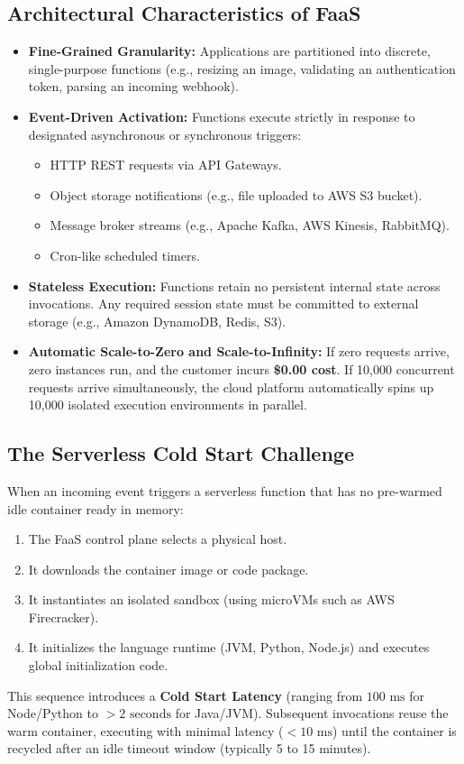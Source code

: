 \documentclass[11pt,a4paper,openany]{report}
\begin{document}
\subsection{Architectural Characteristics of FaaS}
\begin{itemize}[leftmargin=*]
  \item \textbf{Fine-Grained Granularity:} Applications are partitioned into discrete, single-purpose functions (e.g., resizing an image, validating an authentication token, parsing an incoming webhook).
  \item \textbf{Event-Driven Activation:} Functions execute strictly in response to designated asynchronous or synchronous triggers:
    \begin{itemize}
      \item HTTP REST requests via API Gateways.
      \item Object storage notifications (e.g., file uploaded to AWS S3 bucket).
      \item Message broker streams (e.g., Apache Kafka, AWS Kinesis, RabbitMQ).
      \item Cron-like scheduled timers.
    \end{itemize}
  \item \textbf{Stateless Execution:} Functions retain no persistent internal state across invocations. Any required session state must be committed to external storage (e.g., Amazon DynamoDB, Redis, S3).
  \item \textbf{Automatic Scale-to-Zero and Scale-to-Infinity:} If zero requests arrive, zero instances run, and the customer incurs \textbf{\$0.00 cost}. If 10,000 concurrent requests arrive simultaneously, the cloud platform automatically spins up 10,000 isolated execution environments in parallel.
\end{itemize}

\subsection{The Serverless Cold Start Challenge}
When an incoming event triggers a serverless function that has no pre-warmed idle container ready in memory:
\begin{enumerate}[leftmargin=*]
  \item The FaaS control plane selects a physical host.
  \item It downloads the container image or code package.
  \item It instantiates an isolated sandbox (using microVMs such as AWS Firecracker).
  \item It initializes the language runtime (JVM, Python, Node.js) and executes global initialization code.
\end{enumerate}
This sequence introduces a \textbf{Cold Start Latency} (ranging from $100\text{ ms}$ for Node/Python to $>2\text{ seconds}$ for Java/JVM). Subsequent invocations reuse the warm container, executing with minimal latency ($< 10\text{ ms}$) until the container is recycled after an idle timeout window (typically 5 to 15 minutes).
\end{document}

